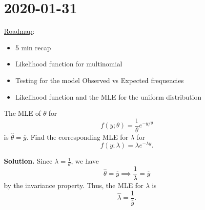 \section{2020-01-31}
\underline{Roadmap}:
\begin{itemize}
    \item 5 min recap
    \item Likelihood function for multinomial
    \item Testing for the model
          \subitem Observed vs Expected frequencies
    \item Likelihood function and the MLE for the uniform distribution
\end{itemize}

\begin{exbox}
    \begin{example}
        The MLE of $ \theta $ for
        \[ f(y;\theta)=\frac{1}{\theta}e^{-y/\theta}  \]
        is $ \hat{\theta}=\overline{y} $. Find the corresponding MLE for
        $ \lambda $ for
        \[ f(y;\lambda)=\lambda e^{-\lambda y}. \]

        \textbf{Solution.} Since $ \lambda=\frac{1}{\theta} $, we have
        \[ \hat{\theta}=\overline{y}\implies \frac{1}{\lambda}=\overline{y} \]
        by the invariance property.
        Thus, the MLE for $ \lambda $ is
        \[ \hat{\lambda}=\frac{1}{\overline{y}}. \]
    \end{example}
\end{exbox}

